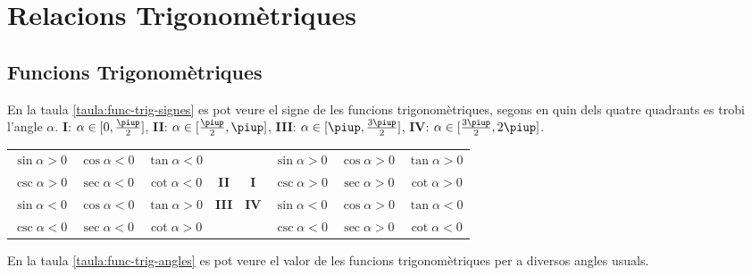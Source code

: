 \chapter{Relacions Trigonomètriques}

\section{Funcions Trigonomètriques}

En la taula \vref{taula:func-trig-signes} es pot veure el signe de
les funcions trigonomètriques, segons en quin dels quatre quadrants
es trobi l'angle $\alpha$. \textbf{I}: $\alpha\in[0,\frac{\piup}{2}]$, \textbf{II}:
$\alpha\in[\frac{\piup}{2},\piup]$, \textbf{III}:
$\alpha\in[\piup,\frac{3\piup}{2}]$, \textbf{IV}:
$\alpha\in[\frac{3\piup}{2},2\piup]$.

\begin{center}
   \label{taula:func-trig-signes}
   \begin{tabular}{cccc|cccc}
   {\color{Green}$\sin\alpha > 0$} & {\color{Red}$\cos\alpha < 0$} & {\color{Red}$\tan\alpha < 0$} & & &
   {\color{Green}$\sin\alpha > 0$} & {\color{Green}$\cos\alpha > 0$} & {\color{Green}$\tan\alpha > 0$} \\
   {\color{Green}$\csc\alpha > 0$} & {\color{Red}$\sec\alpha < 0$} & {\color{Red}$\cot\alpha < 0$} & \textbf{II}&
   \textbf{I} & {\color{Green}$\csc\alpha > 0$} & {\color{Green}$\sec\alpha > 0$} & {\color{Green}$\cot\alpha > 0$} \\
   \hline
   {\color{Red}$\sin\alpha < 0$} & {\color{Red}$\cos\alpha < 0$} & {\color{Green}$\tan\alpha > 0$}
   &\textbf{III} &
   \textbf{IV} & {\color{Red}$\sin\alpha < 0$} & {\color{Green}$\cos\alpha > 0$} & {\color{Red}$\tan\alpha < 0$} \\
   {\color{Red}$\csc\alpha < 0$} & {\color{Red}$\sec\alpha < 0$} & {\color{Green}$\cot\alpha > 0$}  & & &
   {\color{Red}$\csc\alpha < 0$} & {\color{Green}$\sec\alpha > 0$} & {\color{Red}$\cot\alpha < 0$}
   \end{tabular}
\end{center}

En la taula \vref{taula:func-trig-angles} es pot veure el valor de
les funcions trigonomètriques per a diversos angles usuals.

